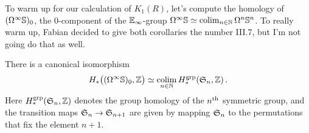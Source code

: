 To warm up for our calculation of $K_1(R)$, let's compute the homology of $(\Omega^\infty\mathbb{S})_0$, the $0$-component of the $\mathbb{E}_\infty$-group $\Omega^\infty\mathbb{S}\simeq \operatorname*{colim}_{n\in\mathbb{N}}\Omega^n\mathbb{S}^n$. To really warm up, Fabian decided to give both corollaries the number III.7, but I'm not going do that as well.
\begin{smallcor}\label{cor:GroupHomologyOfSn}
	There is a canonical isomorphism
	\begin{equation*}
		H_*\big((\Omega^\infty\mathbb{S})_0,\mathbb{Z}\big)\simeq \operatorname*{colim}_{n\in\mathbb{N}} H_*^{\mathrm{grp}}(\mathfrak{S}_n,\mathbb{Z})\,.
	\end{equation*}
	Here $H_*^\mathrm{grp}(\mathfrak{S}_n,\mathbb{Z})$ denotes the group homology of the $n^{\text{th}}$ symmetric group, and the transition maps $\SS_n \morphism \SS_{n+1}$ are given by mapping $\mathfrak{S}_n$ to the permutations that fix the element $n+1$.
\end{smallcor}
